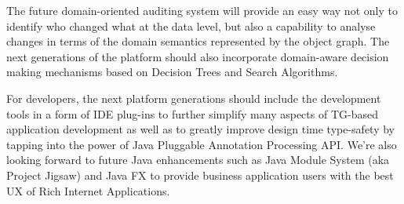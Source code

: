  The future domain-oriented auditing system will provide an easy way not only to identify who changed what at the data level, but also a capability to analyse changes in terms of the domain semantics represented by the object graph.  
  The next generations of the platform should also incorporate domain-aware decision making mechanisms based on Decision Trees and Search Algorithms.

  For developers, the next platform generations should include the development tools in a form of IDE plug-ins to further simplify many aspects of TG-based application development as well as to greatly improve design time type-safety by tapping into the power of Java Pluggable Annotation Processing API.
  We're also looking forward to future Java enhancements such as Java Module System (aka Project Jigsaw) and Java FX to provide business application users with the best UX of Rich Internet Applications.